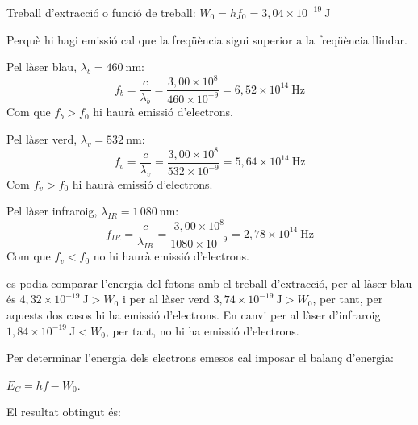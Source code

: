 \begin{solapartat}
 Treball d'extracció o funció de treball: $W_0 = hf_0 = 3,04\times 10^{-19}\ \mathrm{J}$

 Perquè hi hagi emissió cal que la freqüència sigui superior a la freqüència llindar.

 Pel làser blau, $\lambda_b = 460\ \mathrm{nm}$:
\[ f_b = \frac{c}{\lambda_b} = \frac{3,00\times 10^{8}}{460\times 10^{-9}} = 6,52\times 10^{14}\ \mathrm{Hz} \]
Com que $f_b > f_0$ hi haurà emissió d'electrons.

 Pel làser verd, $\lambda_v = 532\ \mathrm{nm}$:
\[ f_v = \frac{c}{\lambda_v} = \frac{3,00\times 10^{8}}{532\times 10^{-9}} = 5,64\times 10^{14}\ \mathrm{Hz} \]
Com $f_v > f_0$ hi haurà emissió d'electrons.

 Pel làser infraroig, $\lambda_{IR} = 1\,080\ \mathrm{nm}$:
\[ f_{IR} = \frac{c}{\lambda_{IR}} = \frac{3,00\times 10^{8}}{1080\times 10^{-9}} = 2,78\times 10^{14}\ \mathrm{Hz} \]
Com que $f_v < f_0$ no hi haurà emissió d'electrons.

 es podia comparar l'energia del fotons amb el treball d'extracció, per al làser blau és $4,32\times 10^{-19}\ \mathrm{J} > W_0$ i per al làser verd $3,74\times 10^{-19}\ \mathrm{J} > W_0$, per tant, per aquests dos casos hi ha emissió d'electrons. En canvi per al làser d'infraroig $1,84\times 10^{-19}\ \mathrm{J} < W_0$, per tant, no hi ha emissió d'electrons.

 Per determinar l'energia dels electrons emesos cal imposar el balanç d'energia:

$E_C = hf - W_0$.

El resultat obtingut és:

\begin{center}
\end{center}


\end{solapartat}
